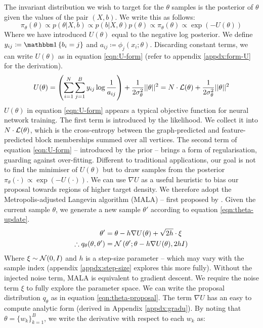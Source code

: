 The invariant distribution we wish to target for the $\theta$ samples is the posterior of $\theta$ given the values of the pair $(X, b)$. We write this as follows:
%
\begin{equation}
	\pi_\theta(\theta) \propto p(\theta | X, b) \propto p(b | X, \theta) p(\theta) \propto \pi_\theta (\theta) \propto  \exp \left( - U(\theta) \right)
\end{equation}
%
Where we have introduced $U(\theta)$ equal to the negative log posterior. We define $y_{ij} \coloneqq \one \left\{ b_i = j \right\}$ and $a_{ij} \coloneqq \phi_j(x_i; \theta)$. Discarding constant terms, we can write $U(\theta)$ as in equation \ref{eqn:U-form} (refer to appendix \ref{appdx:form-U} for the derivation).
%
\begin{equation}
	U(\theta) = \left( \sum_{i=1}^{N} \sum_{j=1}^{B} y_{ij} \log \frac{1}{a_{ij}} \right)
	+ \frac{1}{2\sigma_\theta^2} ||\theta||^2 = N \cdot \mathcal{L}(\theta) + \frac{1}{2\sigma_\theta^2} ||\theta||^2
	\label{eqn:U-form}
\end{equation}
%
$U(\theta)$ in equation \ref{eqn:U-form} appears a typical objective function for neural network training. The first term is introduced by the likelihood. We collect it into $N \cdot \mathcal{L}(\theta)$, which is the cross-entropy between the graph-predicted and feature-predicted block memberships summed over all vertices. The second term of equation \ref{eqn:U-form} -- introduced by the prior -- brings a form of regularisation, guarding against over-fitting. Different to traditional applications, our goal is not to find the minimiser of $U(\theta)$ but to draw samples from the posterior $\pi_\theta(\cdot) \propto \exp(-U(\cdot))$. We can use $\nabla U$ as a useful heuristic to bias our proposal towards regions of higher target density. We therefore adopt the Metropolis-adjusted Langevin algorithm (MALA) -- first proposed by \citet{mala-tweedie}. Given the current sample $\theta$, we generate a new sample $\theta'$ according to equation \ref{eqn:theta-update}.
%
\begin{align}
	\theta' &= \theta - h \nabla U(\theta) + \sqrt{2h} \cdot \xi
	\label{eqn:theta-update} \\
	\therefore q_\theta(\theta, \theta') &= \mathcal{N} \left( \theta' ; \theta - h \nabla U(\theta), 2h I \right)
	\label{eqn:theta-proposal}
\end{align}
%
Where $\xi \sim \mathcal{N}(0, I)$ and $h$ is a step-size parameter -- which may vary with the sample index (appendix \ref{appdx:step-size} explores this more fully). Without the injected noise term, MALA is equivalent to gradient descent. We require the noise term $\xi$ to fully explore the parameter space. We can write the proposal distribution $q_\theta$ as in equation \ref{eqn:theta-proposal}. The term $\nabla U$ has an easy to compute analytic form (derived in Appendix \ref{appdx:gradu}). By noting that $\theta = \{w_k\}_{k=1}^{B}$, we write the derivative with respect to each $w_k$ as:
